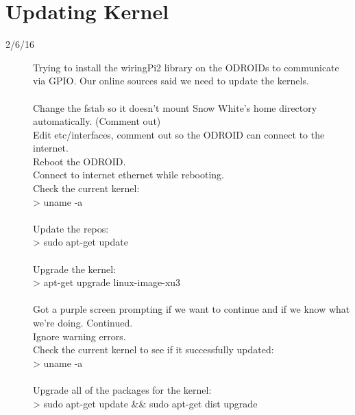 \section{Updating Kernel}
\begin{description}
\item [2/6/16] Trying to install the wiringPi2 library on the ODROIDs to communicate via GPIO. Our online sources said we need to update the kernels. \\ \\
Change the fstab so it doesn't mount Snow White's home directory automatically. (Comment out) \\
Edit etc/interfaces, comment out so the ODROID can connect to the internet.\\
Reboot the ODROID.\\
Connect to internet ethernet while rebooting. \\
Check the current kernel: \\
> uname -a \\ \\
Update the repos: \\
> sudo apt-get update \\ \\
Upgrade the kernel: \\
> apt-get upgrade linux-image-xu3 \\ \\
Got a purple screen prompting if we want to continue and if we know what we're doing. Continued. \\
Ignore warning errors. \\
Check the current kernel to see if it successfully updated: \\
> uname -a \\ \\
Upgrade all of the packages for the kernel: \\
> sudo apt-get update \&\& sudo apt-get dist upgrade
\end{description}